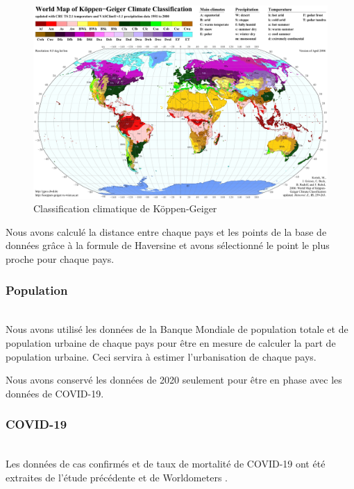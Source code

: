 \documentclass[12pt]{iEEEtran}
\begin{document}
\begin{figure}[h!]
    \centering
    \includegraphics[width=\columnwidth]{img/KG_classification.jpg}
    \caption{Classification climatique de Köppen-Geiger}
    \label{fig:KG_classification}
\end{figure}

Nous avons calculé la distance
entre chaque pays et les points de la base de données grâce à la formule de Haversine
\cite{haversine} et avons sélectionné le point le plus proche pour chaque pays.

\newpage

\subsubsection{Population}\hfill\\
Nous avons utilisé les données de la Banque Mondiale de population totale \cite{total_pop} et
de population urbaine \cite{urban_pop} de chaque pays pour être en mesure de calculer la part
de population urbaine. Ceci servira à estimer l'urbanisation de chaque pays.

Nous avons conservé les données de 2020 seulement pour être en phase avec les données de COVID-19.
\\

\subsubsection{COVID-19}\hfill\\
Les données de cas confirmés et de taux de mortalité de COVID-19 ont été extraites de l'étude
précédente \cite{kaggle} \cite{mortality_rate} et de Worldometers \cite{mortality_website}.
\end{document}
